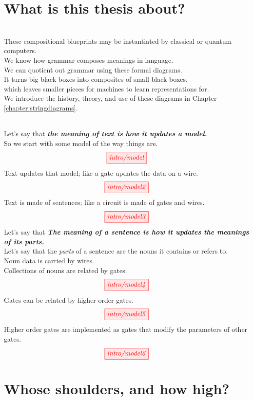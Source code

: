 \begin{fullwidth}
\begin{centering}

\section{What is this thesis about?}

\\
These compositional blueprints may be instantiated by classical or quantum computers.\\
We know how grammar composes meanings in language.\\
We can quotient out grammar using these formal diagrams.\\
It turns big black boxes into composites of small black boxes,\\
which leaves smaller pieces for machines to learn representations for.\\
We introduce the history, theory, and use of these diagrams in Chapter \ref{chapter:stringdiagrams}.

\\
Let's say that \textbf\emph{{the meaning of text is how it updates a model.}}\\
So we start with some model of the way things are.
\[\tikzfig{intro/model}\]
Text updates that model;
like a gate updates the data on a wire.
\[\tikzfig{intro/model2}\]
Text is made of sentences;
like a circuit is made of gates and wires.
\[\tikzfig{intro/model3}\]
Let's say that \textbf{\emph{The meaning of a sentence is how it updates the meanings of its parts.}}\\
Let's say that the \emph{parts} of a sentence are the nouns it contains or refers to.\\
Noun data is carried by wires.\\
Collections of nouns are related by gates.
\[\tikzfig{intro/model4}\]
Gates can be related by higher order gates.
\[\tikzfig{intro/model5}\]
Higher order gates are implemented as gates that modify the parameters of other gates.
\[\tikzfig{intro/model6}\]

\section{Whose shoulders, and how high?}


\end{centering}
\end{fullwidth}
